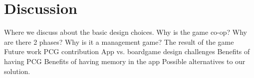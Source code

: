 \section{Discussion}
Where we discuss about the basic design choices. Why is the game co-op? Why are there 2 phases? Why is it a management game?
The result of the game
Future work
PCG contribution
App vs. boardgame design challenges
Benefits of having PCG
Benefits of having memory in the app
Possible alternatives to our solution.